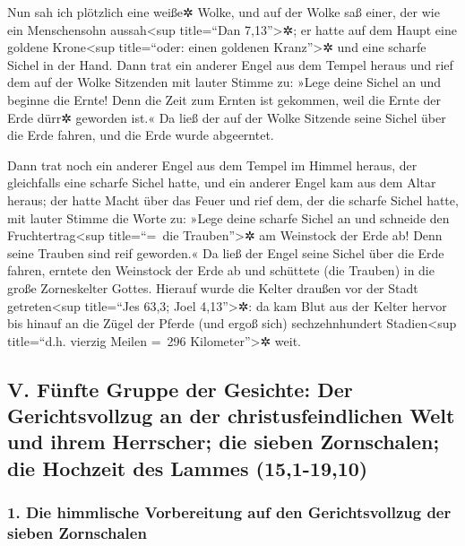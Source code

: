  Nun sah ich plötzlich eine weiße✲ Wolke, und auf der
Wolke saß einer, der wie ein Menschensohn aussah\textless sup
title=``Dan 7,13''\textgreater✲; er hatte auf dem Haupt eine goldene
Krone\textless sup title=``oder: einen goldenen Kranz''\textgreater✲ und
eine scharfe Sichel in der Hand.  Dann trat ein anderer
Engel aus dem Tempel heraus und rief dem auf der Wolke Sitzenden mit
lauter Stimme zu: »Lege deine Sichel an und beginne die Ernte! Denn die
Zeit zum Ernten ist gekommen, weil die Ernte der Erde dürr✲ geworden
ist.«  Da ließ der auf der Wolke Sitzende seine Sichel
über die Erde fahren, und die Erde wurde abgeerntet.

 Dann trat noch ein anderer Engel aus dem Tempel im
Himmel heraus, der gleichfalls eine scharfe Sichel hatte,
 und ein anderer Engel kam aus dem Altar heraus; der
hatte Macht über das Feuer und rief dem, der die scharfe Sichel hatte,
mit lauter Stimme die Worte zu: »Lege deine scharfe Sichel an und
schneide den Fruchtertrag\textless sup title=``=~die
Trauben''\textgreater✲ am Weinstock der Erde ab! Denn seine Trauben sind
reif geworden.«  Da ließ der Engel seine Sichel über die
Erde fahren, erntete den Weinstock der Erde ab und schüttete (die
Trauben) in die große Zorneskelter Gottes.  Hierauf wurde
die Kelter draußen vor der Stadt getreten\textless sup title=``Jes 63,3;
Joel 4,13''\textgreater✲: da kam Blut aus der Kelter hervor bis hinauf
an die Zügel der Pferde (und ergoß sich) sechzehnhundert
Stadien\textless sup title=``d.h. vierzig Meilen =~296
Kilometer''\textgreater✲ weit.

\hypertarget{v.-fuxfcnfte-gruppe-der-gesichte-der-gerichtsvollzug-an-der-christusfeindlichen-welt-und-ihrem-herrscher-die-sieben-zornschalen-die-hochzeit-des-lammes-151-1910}{%
\subsection{V. Fünfte Gruppe der Gesichte: Der Gerichtsvollzug an der
christusfeindlichen Welt und ihrem Herrscher; die sieben Zornschalen;
die Hochzeit des Lammes
(15,1-19,10)}\label{v.-fuxfcnfte-gruppe-der-gesichte-der-gerichtsvollzug-an-der-christusfeindlichen-welt-und-ihrem-herrscher-die-sieben-zornschalen-die-hochzeit-des-lammes-151-1910}}

\hypertarget{die-himmlische-vorbereitung-auf-den-gerichtsvollzug-der-sieben-zornschalen}{%
\subsubsection{1. Die himmlische Vorbereitung auf den Gerichtsvollzug
der sieben
Zornschalen}\label{die-himmlische-vorbereitung-auf-den-gerichtsvollzug-der-sieben-zornschalen}}

